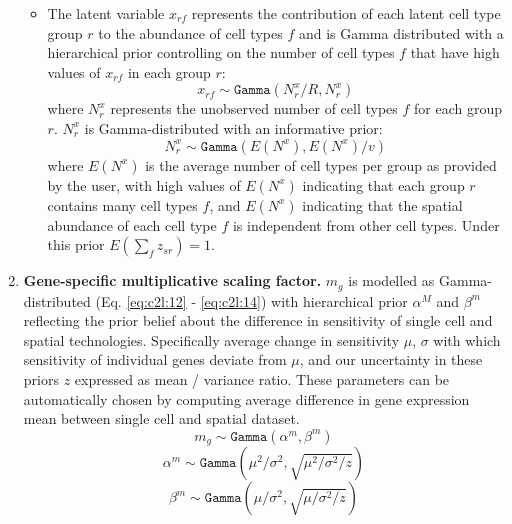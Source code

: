 \documentclass[11pt,a4paper]{article}
\begin{document}
\begin{enumerate}
\begin{itemize}
        \item The latent variable $x_{rf}$ represents the contribution of each latent cell type group $r$ to the abundance of cell types $f$ and is Gamma distributed with a hierarchical prior controlling on the number of cell types $f$ that have high values of $x_{rf}$ in each group $r$:
        \begin{equation} \label{eq:c2l:10}
        x_{rf} \sim \mathtt{Gamma}(N_r^{x} / R, N_r^{x})
        \end{equation}
        where $N_r^{x}$ represents the unobserved number of cell types $f$ for each group $r$. $N_r^{x}$ is Gamma-distributed with an informative prior:
        \begin{equation} \label{eq:c2l:11}
        N_r^{x} \sim \mathtt{Gamma}(E(N^{x}), E(N^{x}) / v)
        \end{equation}
        where $E(N^{x})$ is the average number of cell types per group as provided by the user, with high values of $E(N^{x})$ indicating that each group $r$ contains many cell types $f$, and $E(N^{x})$ indicating that the spatial abundance of each cell type $f$ is independent from other cell types. Under this prior $E(\sum_{f} z_{sr}) = 1$.
    
        \end{itemize}
    
    \item \textbf{Gene-specific multiplicative scaling factor.} $m_{g}$ is modelled as Gamma-distributed (Eq. \ref{eq:c2l:12} - \ref{eq:c2l:14}) with hierarchical prior $\alpha^M$ and $\beta^m$ reflecting the prior belief about the difference in sensitivity of single cell and spatial technologies. Specifically average change in sensitivity $\mu$, $\sigma$ with which sensitivity of individual genes deviate from $\mu$, and our uncertainty in these priors $z$ expressed as mean / variance ratio. These parameters can be automatically chosen by computing average difference in gene expression mean between single cell and spatial dataset.
    \begin{equation} \label{eq:c2l:12}
    m_{g} \sim \mathtt{Gamma}(\alpha^m, \beta^m) 
    \end{equation}
    \begin{equation} \label{eq:c2l:13}
    \alpha^m \sim \mathtt{Gamma}(\mu ^ 2 / \sigma ^ 2,  \sqrt{\mu ^ 2 / \sigma ^ 2 / z})
    \end{equation}
    \begin{equation} \label{eq:c2l:14}
    \beta^m \sim \mathtt{Gamma}(\mu / \sigma ^ 2,  \sqrt{\mu / \sigma ^ 2 / z})
    \end{equation}
    

\end{enumerate}
\end{document}
